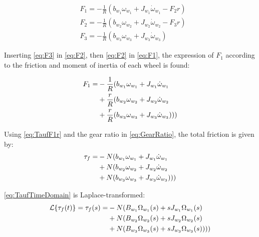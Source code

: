 \begin{subequations} 
	\begin{flalign}
		&F_1 = -\frac{1}{R} (b_{w_1}\omega_{w_1} + J_{w_1}\dot{\omega}_{w_1} - F_2r) 	\label{eq:F1}\\ 
		&F_2 = -\frac{1}{R} (b_{w_2}\omega_{w_2} +  J_{w_2}\dot{\omega}_{w_2} - F_3r)	\label{eq:F2}\\
		&F_3 = -\frac{1}{R} (b_{w_3}\omega_{w_3} + J_{w_3}\dot{\omega}_{w_3})			\label{eq:F3}
	\end{flalign}
\end{subequations}

Inserting \autoref{eq:F3} in \autoref{eq:F2}, then \autoref{eq:F2} in \autoref{eq:F1}, the expression of $F_1$ according to the friction and moment of inertia of each wheel is found:

\begin{subequations} 
	\begin{flalign}
	F_1 = &-\frac{1}{R} (b_{w_1}\omega_{w_1} + J_{w_1}\dot{\omega}_{w_1} \notag \\
	& +\frac{r}{R} (b_{w_2}\omega_{w_2} + J_{w_2}\dot{\omega}_{w_2} \notag \\
	& +\frac{r}{R} (b_{w_3}\omega_{w_3} + J_{w_3}\dot{\omega}_{w_3})))
	\end{flalign}
\end{subequations}


Using \autoref{eq:TaufF1r} and the gear ratio in \autoref{eq:GearRatio}, the total friction is given by: 
\begin{subequations} 
	\begin{flalign} \label{eq:TaufTimeDomain}
	\tau_f = &-N (b_{w_1}\omega_{w_1} + J_{w_1}\dot{\omega}_{w_1} \notag \\
	& +N (b_{w_2}\omega_{w_2} + J_{w_2}\dot{\omega}_{w_2} \notag \\
	& +N (b_{w_3}\omega_{w_3} + J_{w_3}\dot{\omega}_{w_3})))
	\end{flalign}
\end{subequations}

\autoref{eq:TaufTimeDomain} is Laplace-transformed:
\begin{subequations} 
	\begin{flalign} \label{eq:TaufLaplaceDomain}
	\mathcal{L}\{\tau_f(t)\} = \tau_f(s) = &-N (B_{w_1}\Omega_{w_1}(s) + sJ_{w_1}\Omega_{w_1}(s) \notag \\
	& +N (B_{w_2}\Omega_{w_2}(s) + sJ_{w_2}\Omega_{w_2}(s) \notag \\
	& +N (B_{w_3}\Omega_{w_3}(s) + sJ_{w_3}\Omega_{w_3}(s))))
	\end{flalign}
\end{subequations}

